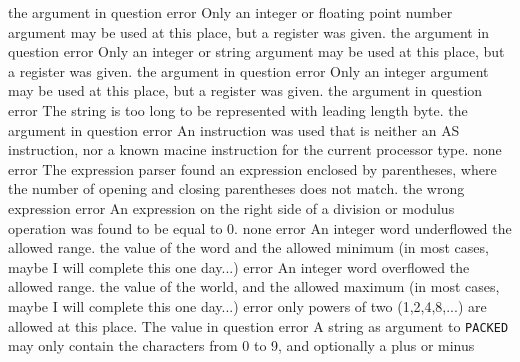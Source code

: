 \documentclass[12pt,twoside]{report}
\newcommand{\asname}{{AS}}
\begin{document}
\begin{description}
               {the argument in question}
               {error}
               {Only an integer or floating point number argument may be used at this place,
                but a register was given.}
               {the argument in question}
               {error}
               {Only an integer or string argument may be used at this place,
                but a register was given.}
               {the argument in question}
               {error}
               {Only an integer argument may be used at this place,
                but a register was given.}
               {the argument in question}
               {error}
               {The string is too long to be represented with leading
                length byte.}
               {the argument in question}
               {error}
               {An instruction was used that is neither an \asname{} instruction, nor a
                known macine instruction for the current processor type.}
               {none}
               {error}
               {The expression parser found an expression enclosed by
                parentheses, where the number of opening and closing
                parentheses does not match.}
               {the wrong expression}
               {error}
               {An expression on the right side of a division or modulus
                operation was found to be equal to 0.}
               {none}
               {error}
               {An integer word underflowed the allowed range.}
               {the value of the word and the allowed minimum (in most
                cases, maybe I will complete this one day...)}
               {error}
               {An integer word overflowed the allowed range.}
               {the value of the world, and the allowed maximum (in most
                cases, maybe I will complete this one day...)}
               {error}
               {only powers of two (1,2,4,8,...) are allowed at this place.}
               {The value in question}
               {error}
               {A string as argument to {\tt PACKED} may only contain the
                characters from 0 to 9, and optionally a plus or minus
}
\end{description}
\end{document}
